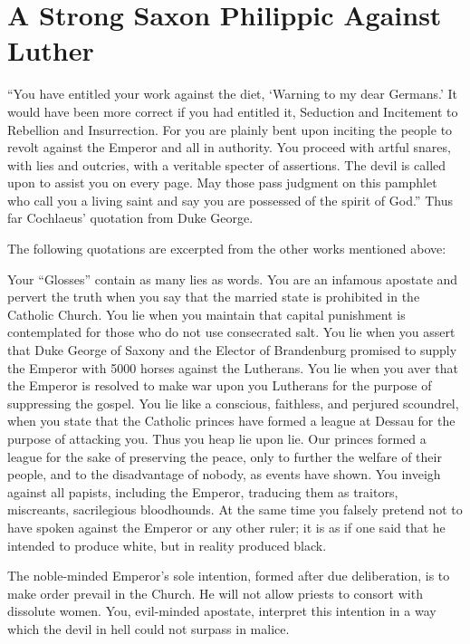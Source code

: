 \section{A Strong Saxon Philippic Against Luther}

“You have entitled your work against the diet, `Warning to my
dear Germans.' It would have been more correct if you had entitled
it, Seduction and Incitement to Rebellion and Insurrection. For you
are plainly bent upon inciting the people to revolt against the Emperor
and all in authority. You proceed with artful snares, with lies
and outcries, with a veritable specter of assertions. The devil is called
upon to assist you on every page. May those pass judgment on
this pamphlet who call you a living saint and say you are possessed
of the spirit of God.” Thus far Cochlaeus’ quotation from Duke
George.

The following quotations are excerpted from the other works mentioned
above:

Your “Glosses” contain as many lies as words. You are an infamous apostate
and pervert the truth when you say that the married state is prohibited
in the Catholic Church. You lie when you maintain that capital punishment
is contemplated for those who do not use consecrated salt. You lie when you
assert that Duke George of Saxony and the Elector of Brandenburg
promised to supply the Emperor with 5000 horses against the Lutherans. You
lie when you aver that the Emperor is resolved to make war upon
you Lutherans for the purpose of suppressing the gospel. You lie like a conscious,
faithless, and perjured scoundrel, when you state that the Catholic princes
have formed a league at Dessau for the purpose of attacking you. Thus you
heap lie upon lie. Our princes formed a league for the sake of preserving the
peace, only to further the welfare of their people, and to the disadvantage
of nobody, as events have shown. You inveigh against all papists, including
the Emperor, traducing them as traitors, miscreants, sacrilegious
bloodhounds. At the same time you falsely pretend not to have spoken
against the Emperor or any other ruler; it is as if one said that he intended
to produce white, but in reality produced black.

The noble-minded Emperor’s sole intention, formed after due deliberation,
is to make order prevail in the Church. He will not allow priests to consort
with dissolute women. You, evil-minded apostate, interpret this intention in
a way which the devil in hell could not surpass in malice.

